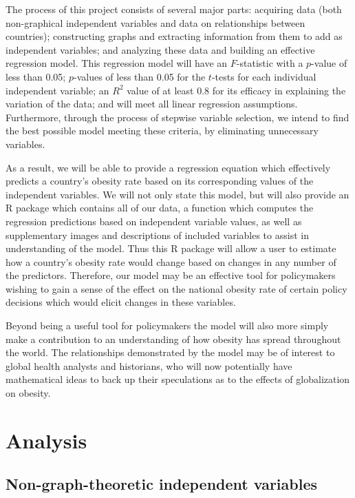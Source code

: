 \documentclass[oneside,12pt]{report}
\begin{document}
The process of this project consists of several major parts: acquiring data (both non-graphical independent variables and data on relationships between countries); constructing graphs and extracting information from them to add as independent variables; and analyzing these data and building an effective regression model. This regression model will have an $F$-statistic with a $p$-value of less than 0.05; $p$-values of less than 0.05 for the $t$-tests for each individual independent variable; an \begin{math}R^2\end{math} value of at least 0.8 for its efficacy in explaining the variation of the data; and will meet all linear regression assumptions. Furthermore, through the process of stepwise variable selection, we intend to find the best possible model meeting these criteria, by eliminating unnecessary variables.

As a result, we will be able to provide a regression equation which effectively predicts a country's obesity rate based on its corresponding values of the independent variables. We will not only state this model, but will also provide an R package which contains all of our data, a function which computes the regression predictions based on independent variable values, as well as supplementary images and descriptions of included variables to assist in understanding of the model. Thus this R package will allow a user to estimate how a country's obesity rate would change based on changes in any number of the predictors. Therefore, our model may be an effective tool for policymakers wishing to gain a sense of the effect on the national obesity rate of certain policy decisions which would elicit changes in these variables.

Beyond being a useful tool for policymakers the model will also more simply make a contribution to an understanding of how obesity has spread throughout the world. The relationships demonstrated by the model may be of interest to global health analysts and historians, who will now potentially have mathematical ideas to back up their speculations as to the effects of globalization on obesity.

\chapter{Analysis}

\section*{Non-graph-theoretic independent variables}
\end{document}
